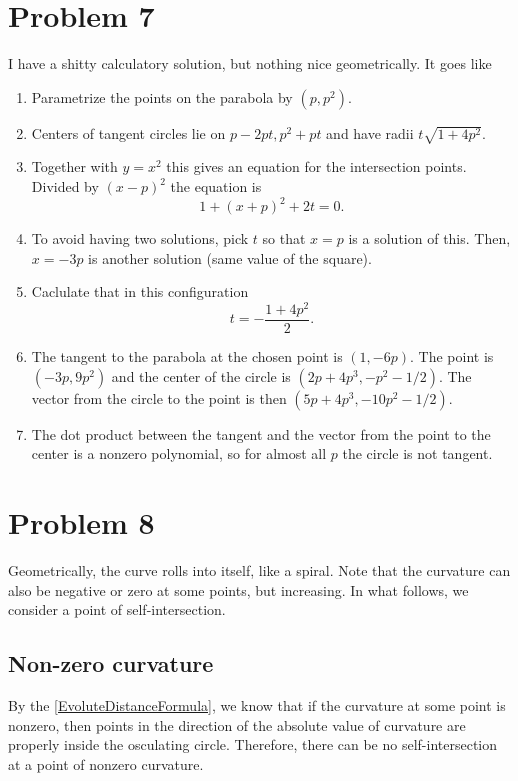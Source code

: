 \section*{Problem 7}
I have a shitty calculatory solution, but nothing nice geometrically. It goes like
\begin{enumerate}
    \item Parametrize the points on the parabola by \( (p, p^2) \).
    \item Centers of tangent circles lie on \( p - 2pt, p^2 + pt \) and have radii \( t\sqrt{1 + 4p^2} \).
    \item Together with \( y = x^2 \) this gives an equation for the intersection points. Divided by \( (x - p)^2 \) the equation is
        \[
        1 + (x+p)^2 + 2t = 0.
        \]
    \item To avoid having two solutions, pick \(t\) so that \( x = p \) is a solution of this. Then, \( x = -3p \) is another solution (same value of the square).
    \item Caclulate that in this configuration
        \[
            t = -\frac{1+4p^2}{2}.
        \]
\item The tangent to the parabola at the chosen point is \( (1, -6p) \). The point is \( (-3p, 9p^2) \) and the center of the circle is \( (2p + 4p^3, -p^2 - 1/2) \). The vector from the circle to the point is then \((5p + 4p^3, -10p^2 -1/2) \).
\item The dot product between the tangent and the vector from the point to the center is a nonzero polynomial, so for almost all \( p \) the circle is not tangent.

\end{enumerate}

\section*{Problem 8}

Geometrically, the curve rolls into itself, like a spiral. Note that the curvature can also be negative or zero at some points, but increasing. In what follows, we consider a point of self-intersection.
\subsection{Non-zero curvature}
By the \ref{EvoluteDistanceFormula}, we know that if the curvature at some point is nonzero, then points in the direction of the absolute value of curvature are properly inside the osculating circle. Therefore, there can be no self-intersection at a point of nonzero curvature.

